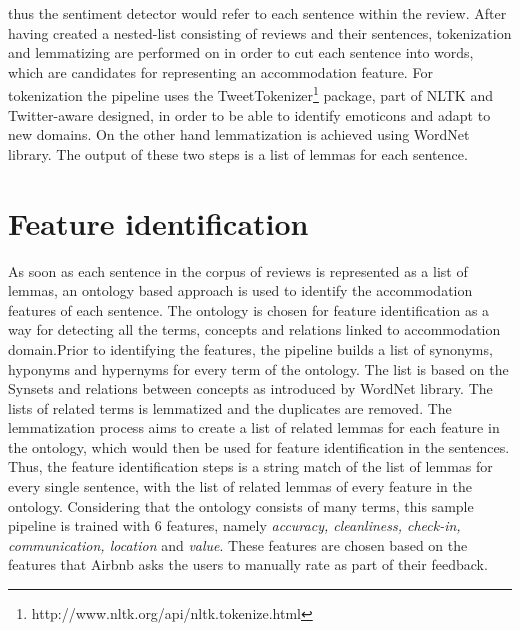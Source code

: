 thus the sentiment detector would refer to each sentence within the review.
%
After having created a nested-list consisting of reviews and their sentences, tokenization and lemmatizing are performed on in order to cut each sentence into words, which are candidates for representing an accommodation feature. For tokenization the pipeline uses the TweetTokenizer\footnote{http://www.nltk.org/api/nltk.tokenize.html} package, part of NLTK and Twitter-aware designed, in order to be able to identify emoticons and adapt to new domains. On the other hand lemmatization is achieved using WordNet library. The output of these two steps is a list of lemmas for each sentence. 

\section{Feature identification}

As soon as each sentence in the corpus of reviews is represented as a list of lemmas, an ontology based approach is used to identify the accommodation features of each sentence. The ontology is chosen for feature identification as a way for detecting all the terms, concepts and relations linked to accommodation domain.Prior to identifying the features, the pipeline builds a list of synonyms, hyponyms and hypernyms for every term of the ontology. The list is based on the Synsets and relations between concepts as introduced by WordNet library. The lists of related terms is lemmatized and the duplicates are removed. The lemmatization process aims to create a list of related lemmas for each feature in the ontology, which would then be used for feature identification in the sentences.
Thus, the feature identification steps is a string match of the list of lemmas for every single sentence, with the list of related lemmas of every feature in the ontology. Considering that the ontology consists of many terms, this sample pipeline is trained with 6 features, namely \textit{accuracy, cleanliness, check-in, communication, location} and \textit{value}. These features are chosen based on the features that Airbnb asks the users to manually rate as part of their feedback.

